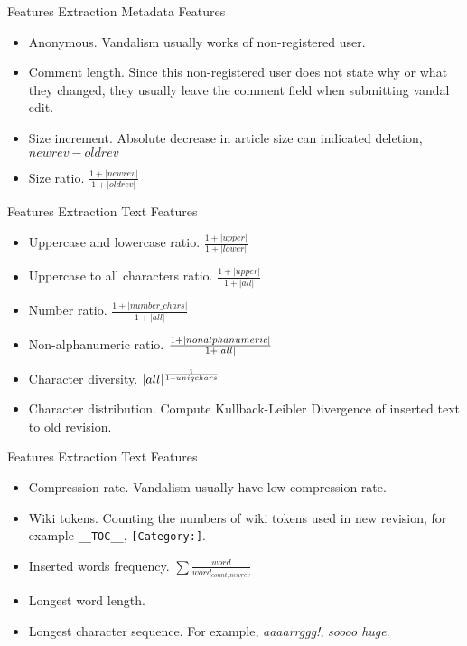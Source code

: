 \documentclass{beamer}
\begin{document}
\begin{frame}
	{Features Extraction}
	{Metadata Features}
	\begin{itemize}
		\item Anonymous. Vandalism usually works of non-registered user.
		\item Comment length. Since this non-registered user does not state why
		or what they changed, they usually leave the comment field when
		submitting vandal edit.
		\item Size increment. Absolute decrease in article size can indicated
		deletion, $ newrev - oldrev $
		\item Size ratio.
			$ \frac{1+|newrev|}{1+|oldrev|} $
	\end{itemize}
\end{frame}

\begin{frame}
	{Features Extraction}
	{Text Features}
	\begin{itemize}
		\item Uppercase and lowercase ratio.
			$ \frac{1+|upper|}{1+|lower|} $
		\item Uppercase to all characters ratio.
			$ \frac{1+|upper|}{1+|all|} $
		\item Number ratio.
			$ \frac{1+|number\_chars|}{1+|all|} $
		\item Non-alphanumeric ratio.
			$ \frac{1+|non\-alphanumeric|}{1+|all|} $
		\item Character diversity.
			$ {|all|}^{\frac{1}{1+uniq\-chars}} $
		\item Character distribution. Compute Kullback-Leibler Divergence of
		inserted text to old revision.
	\end{itemize}
\end{frame}

\begin{frame}
	{Features Extraction}
	{Text Features}
	\begin{itemize}
		\item Compression rate. Vandalism usually have low compression rate.
		\item Wiki tokens. Counting the numbers of wiki tokens used in new
		revision, for example \texttt{\_\_TOC\_\_}, \texttt{[Category:]}.
		\item Inserted words frequency.
			$ \sum{\frac{word}{word_{count,newrev}}} $
		\item Longest word length.
		\item Longest character sequence. For example, \textit{aaaarrggg!},
		\textit{soooo huge}.
	\end{itemize}
\end{frame}
\end{document}
